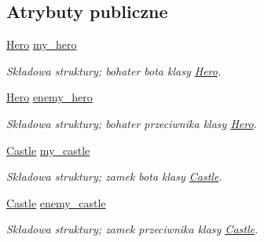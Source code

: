 \subsection*{Atrybuty publiczne}
\begin{DoxyCompactItemize}
\item 
\mbox{\label{structmodel_1_1GameState_a4117472d16817fad15015f2fdd29f792}} 
\hyperlink{classmodel_1_1Hero}{Hero} \hyperlink{structmodel_1_1GameState_a4117472d16817fad15015f2fdd29f792}{my\+\_\+hero}
\begin{DoxyCompactList}\small\item\em Składowa struktury; bohater bota klasy \hyperlink{classmodel_1_1Hero}{Hero}. \end{DoxyCompactList}\item 
\mbox{\label{structmodel_1_1GameState_a460be6a1f98dcfad818686f241c35ad6}} 
\hyperlink{classmodel_1_1Hero}{Hero} \hyperlink{structmodel_1_1GameState_a460be6a1f98dcfad818686f241c35ad6}{enemy\+\_\+hero}
\begin{DoxyCompactList}\small\item\em Składowa struktury; bohater przeciwnika klasy \hyperlink{classmodel_1_1Hero}{Hero}. \end{DoxyCompactList}\item 
\mbox{\label{structmodel_1_1GameState_a877bf51dc420a95db8bfd8ecc2d02131}} 
\hyperlink{classmodel_1_1Castle}{Castle} \hyperlink{structmodel_1_1GameState_a877bf51dc420a95db8bfd8ecc2d02131}{my\+\_\+castle}
\begin{DoxyCompactList}\small\item\em Składowa struktury; zamek bota klasy \hyperlink{classmodel_1_1Castle}{Castle}. \end{DoxyCompactList}\item 
\mbox{\label{structmodel_1_1GameState_a32af616a72b81ca3dfff1afa5e7ecd39}} 
\hyperlink{classmodel_1_1Castle}{Castle} \hyperlink{structmodel_1_1GameState_a32af616a72b81ca3dfff1afa5e7ecd39}{enemy\+\_\+castle}
\begin{DoxyCompactList}\small\item\em Składowa struktury; zamek przeciwnika klasy \hyperlink{classmodel_1_1Castle}{Castle}. \end{DoxyCompactList}\item 

\end{DoxyCompactItemize}
